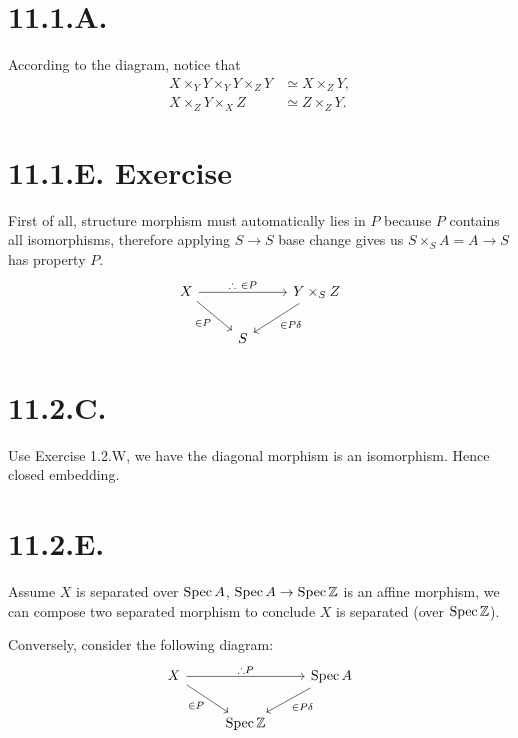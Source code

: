\section{11.1.A.}

According to the diagram, notice that 
\begin{align*}
    X\times_Y Y \times_Y Y\times_Z Y &\simeq X\times_Z Y,\\
    X\times_Z Y \times_X Z &\simeq Z\times_Z Y.
\end{align*}

\section{11.1.E. Exercise}

First of all, structure morphism must automatically lies in $P$ because $P$ contains all isomorphisms, therefore applying $S\to S$ base change gives us $S\times_S A=A\to S$ has property $P$. 
\[%
\begin{tikzcd}
X \arrow[rd, "\in P"'] \arrow[rr, "\therefore ~\in P"] &   & Y\times_S Z \arrow[ld, "\in P\delta"] \\
                                                       & S &                                      
\end{tikzcd}\] 

\section{11.2.C.}

Use Exercise 1.2.W, we have the diagonal morphism is an isomorphism. Hence closed embedding.

\section{11.2.E.}

Assume $X$ is separated over $\operatorname{Spec} A$, $\operatorname{Spec} A\to \operatorname{Spec} \mathbb Z$ is an affine morphism, we can compose two separated morphism to conclude $X$ is separated (over $\operatorname{Spec} \mathbb Z$). 

Conversely, consider the following diagram: 
\[%
\begin{tikzcd}
X \arrow[rr, "\therefore P"] \arrow[rd, "\in P"'] &                              & \operatorname{Spec}A \arrow[ld, "\in P\delta"] \\
                                                  & \operatorname{Spec}\mathbb Z &                                               
\end{tikzcd}\]

